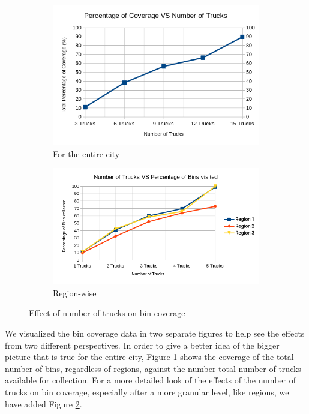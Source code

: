 \documentclass[12pt]{article}
\begin{document}
\begin{figure}[H]
    \centering
    \begin{subfigure}{0.5\textwidth}
        \centering
        \includegraphics[width=\linewidth]{coverage_VS_number_of_trucks.png}
        \caption{For the entire city}\label{figc1}
    \end{subfigure}%
    \begin{subfigure}{0.5\textwidth}
        \centering
        \includegraphics[width=\linewidth]{number_of_trucks_VS_bins_visited.png}
        \caption{Region-wise}\label{figc2}
    \end{subfigure}
    \caption{Effect of number of trucks on bin coverage}
    \label{fig3}
\end{figure}

We visualized the bin coverage data in two separate figures to help see the effects from two different perspectives. In order to give a better idea of the bigger picture that is true for the entire city, Figure \ref{figc1} shows the coverage of the total number of bins, regardless of regions, against the number total number of trucks available for collection. For a more detailed look of the effects of the number of trucks on bin coverage, especially after a more granular level, like regions, we have added Figure \ref{figc2}.
\end{document}
